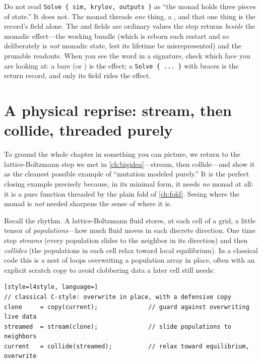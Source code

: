 \begin{pitfall}
Do not read \lstinline[style=l4style]|Solve { sim, krylov, outputs }| as ``the monad
holds three pieces of state.'' It does not. The monad threads \emph{one} thing, a
, and that one thing is the record's  field alone. The
 and  fields are ordinary values the step returns
\emph{beside} the monadic effect---the working bundle (which is reborn each restart and
so deliberately is \emph{not} monadic state, lest its lifetime be misrepresented) and
the prunable readouts. When you see the word  in a signature, check which
face you are looking at: a bare  (or ) is the effect; a
\lstinline[style=l4style]|Solve { ... }| with braces is the return record, and only its
 field rides the effect.
\end{pitfall}

\section{A physical reprise: stream, then collide, threaded purely}
\label{sec:lbm}

To ground the whole chapter in something you can picture, we return to the
lattice-Boltzmann step we met in \cref{ch:bigidea}---stream, then collide---and show
it as the cleanest possible example of ``mutation modeled purely.'' It is the perfect
closing example precisely because, in its minimal form, it needs \emph{no} monad at
all: it is a pure  function threaded by the plain fold
 of \cref{ch:fold}. Seeing where the monad is \emph{not}
needed sharpens the sense of where it is.

Recall the rhythm. A lattice-Boltzmann fluid stores, at each cell of a grid, a little
tensor of \emph{populations}---how much fluid moves in each discrete direction. One
time step \emph{streams} (every population slides to the neighbor in its direction)
and then \emph{collides} (the populations in each cell relax toward local
equilibrium). In a classical code this is a nest of loops overwriting a population
array in place, often with an explicit scratch copy to avoid clobbering data a later
cell still needs:

\begin{lstlisting}[style=l4style, language=]
// classical C-style: overwrite in place, with a defensive copy
clone     = copy(current);              // guard against overwriting live data
streamed  = stream(clone);              // slide populations to neighbors
current   = collide(streamed);          // relax toward equilibrium, overwrite
\end{lstlisting}

